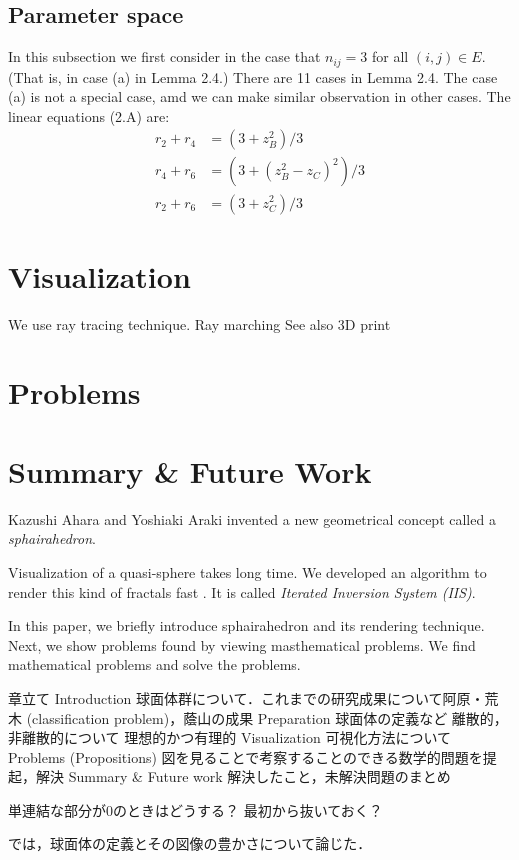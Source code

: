 \documentclass[dvipdfmx]{interact}
\theoremstyle{plain}%
\theoremstyle{definition}
\theoremstyle{remark}
\theoremstyle{problemstyle}
\begin{document}
\subsection{Parameter space}
In this subsection we first consider in the case that $n_{ij} = 3$ for all
$(i, j) \in E$. (That is, in case (a) in Lemma 2.4.) There are 11 cases
in Lemma 2.4. The case (a) is not a special case, amd we can make
similar observation in other cases.
The linear equations (2.A) are:
\begin{align*}
 r_2 + r_4 &= (3 + z_B^2) / 3 \\
 r_4 + r_6 &= (3 + (z_B^2 - z_C)^2 ) / 3 \\
 r_2 + r_6 &= (3 + z_C^2) / 3
\end{align*}

\section{Visualization}
We use ray tracing technique.
Ray marching
See also \cite{bridges2018}
3D print
\section{Problems}
\section{Summary \& Future Work}

Kazushi Ahara and Yoshiaki Araki invented a new geometrical concept
called a \textit{sphairahedron}.

Visualization of a quasi-sphere takes long time.
We developed an algorithm to render this kind of fractals fast
\cite{bridges2018}.
It is called \textit{Iterated Inversion System (IIS)}.

In this paper, we briefly introduce sphairahedron and its rendering
technique.
Next, we show problems found by viewing masthematical problems.
We find mathematical problems and solve the problems.


章立て
Introduction 球面体群について．これまでの研究成果について阿原・荒木
(classification problem)，蔭山の成果
Preparation 球面体の定義など 離散的，非離散的について 理想的かつ有理的
Visualization 可視化方法について
Problems (Propositions) 図を見ることで考察することのできる数学的問題を提起，解決
Summary \& Future work 解決したこと，未解決問題のまとめ

単連結な部分が0のときはどうする？ 最初から抜いておく？

\cite{bridges2018}では，球面体の定義とその図像の豊かさについて論じた．
\end{document}
